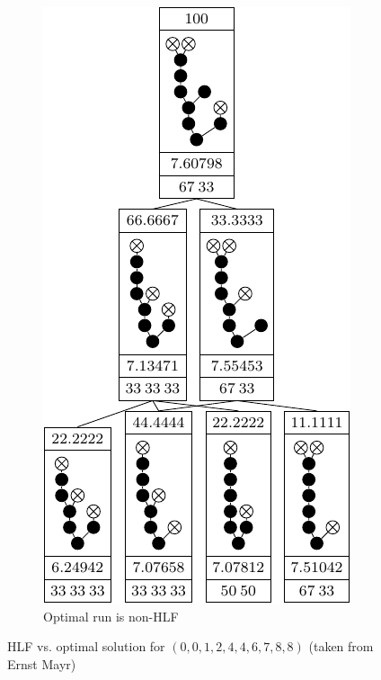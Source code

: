 \begin{figure}[ht]
\begin{subfigure}{.45\linewidth}
    \includegraphics{p3/hlf_not_optimal/0012446788_opt.pdf}
    \caption{Optimal run is non-HLF}
  \end{subfigure}
  \caption{HLF vs. optimal solution for $(0,0,1,2,4,4,6,7,8,8)$ (taken from Ernst Mayr)}
  \label{fig:hlf-vs-opt-0012446788}
\end{figure}
